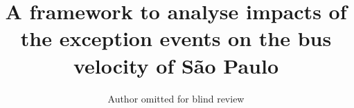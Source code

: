 \documentclass[runningheads]{llncs}
\begin{document}
%
\title{A framework to analyse impacts of the exception events on the bus velocity of São Paulo}
%
%

%
%
%

\author{Author omitted for blind review} %
\end{document}

